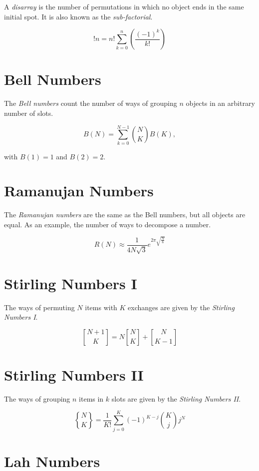 A \emph{disarray} is the number of permutations in which no object ends in the same initial spot. It is also known as the
\emph{sub-factorial}.

\[
	!n = n! \sum_{k = 0}^{n} \left(\frac{{(-1)}^k}{k!}\right)
\]

\section{Bell Numbers}

The \emph{Bell numbers} count the number of ways of grouping \(n\) objects in an arbitrary number of slots.

\[
	B(N) = \sum_{k = 0}^{N-1}\binom{N}{K}B(K),
\]

with \(B(1) = 1\) and \(B(2) = 2\).

\section{Ramanujan Numbers}

The \emph{Ramanujan numbers} are the same as the Bell numbers, but all objects are equal. As an example, the number of ways
to decompose a number.

\[
	R(N) \approx \frac{1}{4N\sqrt{3}} e^{2\pi \sqrt{\frac{N}{6}}}
\]

\section{Stirling Numbers I}

The ways of permuting \(N\) items with \(K\) exchanges are given by the \emph{Stirling Numbers I}.

\[
	\genfrac{[}{]}{0pt}{}{N + 1}{K} = N \genfrac{[}{]}{0pt}{}{N}{K} + \genfrac{[}{]}{0pt}{}{N}{K - 1}
\]

\section{Stirling Numbers II}

The ways of grouping \(n\) items in \(k\) slots are given by the \emph{Stirling Numbers II}.

\[
	\genfrac{\{}{\}}{0pt}{}{N}{K} = \frac{1}{K!} \sum_{j=0}^{K} (-1)^{K - j} \binom{K}{j} j^N
\]

\section{Lah Numbers}

